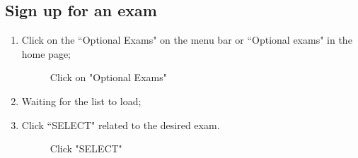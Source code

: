 \documentclass[ManualeUtente]{subfiles}
\begin{document}
\newpage
\subsection{Sign up for an exam}
\begin{enumerate}
	\item Click on the \textquotedblleft Optional Exams" on the menu bar or \textquotedblleft Optional exams" in the home page;
	\begin{figure}[H]
		\centering
		\caption{Click on "Optional Exams"}
		\label{fig:Click on "Optional Exams"}
	\end{figure}
	\item Waiting for the list to load;
	\item Click \textquotedblleft SELECT" related to the desired exam.
	\begin{figure}[H]
	\centering
	\caption{Click "SELECT"}
	\label{fig:Click "SELECT"}
	\end{figure}
\end{enumerate}
\end{document}
